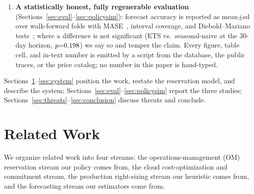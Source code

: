 \documentclass[10pt,journal]{IEEEtran}
\begin{document}
\begin{enumerate}
and \extPolPctNv\%. A sample-average-approximation stochastic
program~\cite{chaisiri2012provisioning,bulbul2021provisioning} recovers the
closed-form quantile to within \polSaaNvGapPct\% (mutual validation), and a
surge-aware dual-capacity $(K_0,K_1)$ policy---the first step toward the
$(s,S)$ dynamics of~\cite{chen2024capacity}---is worth little on tame
synthetic demand ($+\polDualGain$ points) but $+\extPolDualGain$ points on
real bursty demand, of which a \emph{causal} one-period activation rule
retains $+\extPolDualcGain$: empirical evidence that the two-tier contract
structure earns its complexity exactly when surge states persist long enough
to be acted on---the regime it was designed for.
\item \textbf{A statistically honest, fully regenerable evaluation}
(Sections~\ref{sec:eval}--\ref{sec:policysim}): forecast accuracy is reported
as mean$\pm$sd over walk-forward folds with MASE~\cite{hyndman2006mase},
interval coverage, and Diebold--Mariano
tests~\cite{diebold1995comparing,harvey1997testing}; where a difference is
not significant (ETS vs.\ seasonal-naive at the $30$-day horizon,
$p{=}0.198$) we say so and temper the claim. Every figure, table
cell, and in-text number is emitted by a script from the database, the public
traces, or the price catalog; no number in this paper is hand-typed.
\end{enumerate}

Sections~\ref{sec:related}--\ref{sec:system} position the work, restate the
reservation model, and describe the system;
Sections~\ref{sec:eval}--\ref{sec:policysim} report the three studies;
Sections~\ref{sec:threats}--\ref{sec:conclusion} discuss threats and
conclude.

\section{Related Work}\label{sec:related}
We organize related work into four streams: the operations-management (OM)
reservation stream our policy comes from, the cloud cost-optimization and
commitment stream, the production right-sizing stream our heuristic comes
from, and the forecasting stream our estimators come from.
\end{document}
